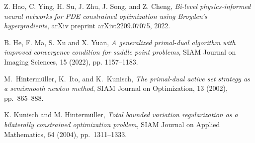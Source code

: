 \documentclass[final]{siamart171218}
\theoremstyle{remark}
\begin{document}
\begin{thebibliography}{10}
	
	Z. Hao, C. Ying, H. Su,  J. Zhu, J. Song, and Z. Cheng, {\em Bi-level physics-informed neural networks for PDE constrained optimization using Broyden's hypergradients}, arXiv preprint arXiv:2209.07075, 2022.
	

	
	B. He, F. Ma, S. Xu and X. Yuan, {\em A generalized primal-dual algorithm with improved convergence condition for saddle point problems}, SIAM Journal on Imaging Sciences, 15 (2022), pp. 1157--1183.
	
	
	
%	
	
		
	
	{ M.~Hinterm{\"u}ller, K.~Ito, and K.~Kunisch}, {\em The primal-dual active
		set strategy as a semismooth newton method}, SIAM Journal on Optimization, 13
	(2002), pp.~865--888.
	
	K. Kunisch and M. Hintermüller, {\em Total bounded variation regularization as a bilaterally constrained optimization problem}, SIAM Journal on Applied Mathematics, 64 (2004), pp.~1311--1333.
	
		

\end{thebibliography}
\end{document}
